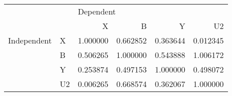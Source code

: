 \begin{tabular}{llrrrr}
\toprule
            &    & \multicolumn{4}{l}{Dependent} \\
            &    &         X &         B &         Y &        U2 \\
\midrule
Independent & X &  1.000000 &  0.662852 &  0.363644 &  0.012345 \\
            & B &  0.506265 &  1.000000 &  0.543888 &  1.006172 \\
            & Y &  0.253874 &  0.497153 &  1.000000 &  0.498072 \\
            & U2 &  0.006265 &  0.668574 &  0.362067 &  1.000000 \\
\bottomrule
\end{tabular}
